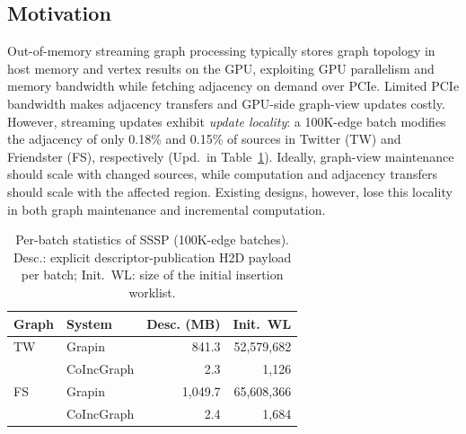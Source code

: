 \subsection{Motivation}
\label{sec:motivation}
Out-of-memory streaming graph processing typically stores graph topology in host memory and vertex results on the GPU, exploiting GPU parallelism and memory bandwidth while fetching adjacency on demand over PCIe. Limited PCIe bandwidth makes adjacency transfers and GPU-side graph-view updates costly. However, streaming updates exhibit \textit{update locality}: a 100K-edge batch modifies the adjacency of only 0.18\% and 0.15\% of sources in Twitter (TW) and Friendster (FS), respectively (Upd.\ in Table~\ref{tab:motivation}). Ideally, graph-view maintenance should scale with changed sources, while computation and adjacency transfers should scale with the affected region. Existing designs, however, lose this locality in both graph maintenance and incremental computation.

\begin{table}[!htbp]
\centering
\caption{Per-batch statistics of SSSP (100K-edge batches). Desc.: explicit descriptor-publication H2D payload per batch; Init.\ WL: size of the initial insertion worklist.}
\label{tab:motivation}
\footnotesize
\setlength{\tabcolsep}{4pt}
\begin{tabular}{llrr}
\hline
Graph & System & Desc. (MB) & Init.\ WL \\
\hline
TW & Grapin & 841.3 & 52,579,682 \\
   & CoIncGraph & 2.3 & 1,126 \\
\hline
FS & Grapin & 1,049.7 & 65,608,366 \\
   & CoIncGraph & 2.4 & 1,684 \\
\hline
\end{tabular}
\end{table}

